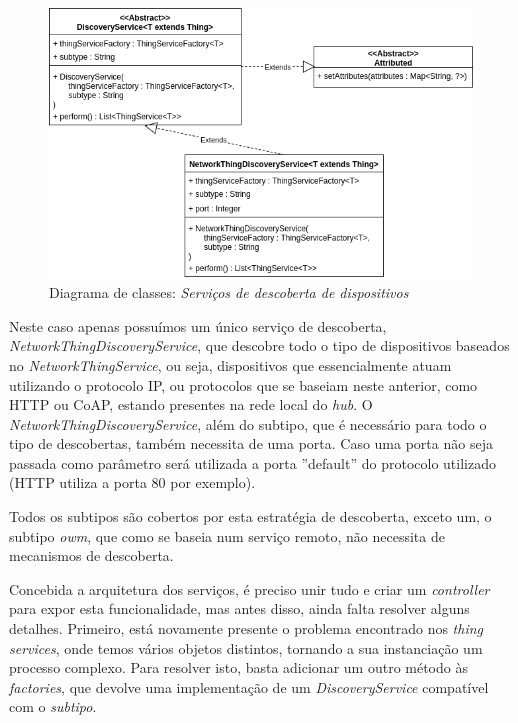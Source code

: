 \begin{figure}[H]
  \centering
        \includegraphics[scale=0.6]{img/hub-discovery.png}
  \caption{Diagrama de classes: \textit{Serviços de descoberta de dispositivos}}
\end{figure}

Neste caso apenas possuímos um único serviço de descoberta, \textit{NetworkThingDiscoveryService}, que descobre todo o tipo de dispositivos baseados no \textit{NetworkThingService}, ou seja, dispositivos que essencialmente atuam utilizando o protocolo IP, ou protocolos que se baseiam neste anterior, como HTTP ou CoAP, estando presentes na rede local do \textit{hub}. O \textit{NetworkThingDiscoveryService}, além do subtipo, que é necessário para todo o tipo de descobertas, também necessita de uma porta. Caso uma porta não seja passada como parâmetro será utilizada a porta ''default'' do protocolo utilizado (HTTP utiliza a porta 80 por exemplo).

Todos os subtipos são cobertos por esta estratégia de descoberta, exceto um, o subtipo \textit{owm}, que como se baseia num serviço remoto, não necessita de mecanismos de descoberta.

Concebida a arquitetura dos serviços, é preciso unir tudo e criar um \textit{controller} para expor esta funcionalidade, mas antes disso, ainda falta resolver alguns detalhes. Primeiro, está novamente presente o problema encontrado nos \textit{thing services}, onde temos vários objetos distintos, tornando a sua instanciação um processo complexo. Para resolver isto, basta adicionar um outro método às \textit{factories}, que devolve uma implementação de um \textit{DiscoveryService} compatível com o \textit{subtipo}.


